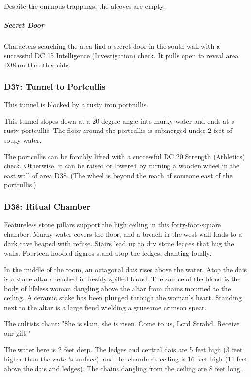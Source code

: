 \documentclass[10pt,a4paper,twoside,bg=print,twocolumn,openany,nodeprecatedcode]{dndbook}
\begin{document}
Despite the ominous trappings, the alcoves are empty.

\subparagraph{Secret Door}
Characters searching the area find a secret door in the south wall with a successful DC 15 Intelligence (Investigation) check. It pulls open to reveal area D38 on the other side.

\subsubsection{D37: Tunnel to Portcullis}
\begin{DndReadAloud}{}
This tunnel is blocked by a rusty iron portcullis.

\end{DndReadAloud}

This tunnel slopes down at a 20-degree angle into murky water and ends at a rusty portcullis. The floor around the portcullis is submerged under 2 feet of soupy water.

The portcullis can be forcibly lifted with a successful DC 20 Strength (Athletics) check. Otherwise, it can be raised or lowered by turning a wooden wheel in the east wall of area D38. (The wheel is beyond the reach of someone east of the portcullis.)

\subsubsection{D38: Ritual Chamber}
\begin{DndReadAloud}{}
Featureless stone pillars support the high ceiling in this forty-foot-square chamber. Murky water covers the floor, and a breach in the west wall leads to a dark cave heaped with refuse. Stairs lead up to dry stone ledges that hug the walls. Fourteen hooded figures stand atop the ledges, chanting loudly.

In the middle of the room, an octagonal dais rises above the water. Atop the dais is a stone altar drenched in freshly spilled blood. The source of the blood is the body of lifeless woman dangling above the altar from chains mounted to the ceiling. A ceramic stake has been plunged through the woman's heart. Standing next to the altar is a large fiend wielding a gruesome crimson spear.

\end{DndReadAloud}

The cultists chant: "She is slain, she is risen. Come to us, Lord Strahd. Receive our gift!"

The water here is 2 feet deep. The ledges and central dais are 5 feet high (3 feet higher than the water's surface), and the chamber's ceiling is 16 feet high (11 feet above the dais and ledges). The chains dangling from the ceiling are 8 feet long.
\end{document}
